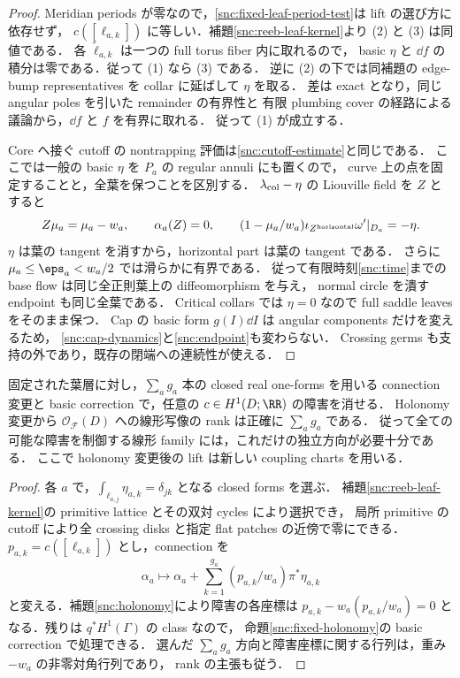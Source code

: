 \begin{proof}
Meridian periods が零なので，\eqref{snc:fixed-leaf-period-test}は lift の選び方に依存せず，
$c([\ell_{a,k}])$ に等しい．補題\ref{snc:reeb-leaf-kernel}より (2) と (3) は同値である．
各 $\widetilde\ell_{a,k}$ は一つの full torus fiber 内に取れるので，
basic $\eta$ と $\dd f$ の積分は零である．従って (1) なら (3) である．
逆に (2) の下では同補題の edge-bump representatives を collar に延ばして $\eta$ を取る．
差は exact となり，同じ angular poles を引いた remainder の有界性と
有限 plumbing cover の経路による議論から，$\dd f$ と $f$ を有界に取れる．
従って (1) が成立する．

Core へ接ぐ cutoff の nontrapping 評価は\eqref{snc:cutoff-estimate}と同じである．
ここでは一般の basic $\eta$ を $P_a$ の regular annuli にも置くので，
curve 上の点を固定することと，全葉を保つことを区別する．
$\lambda_{\rm col}-\eta$ の Liouville field を $Z$ とすると
\[
 Z\mu_a=\mu_a-w_a,\qquad \alpha_a(Z)=0,\qquad
 (1-\mu_a/w_a)\iota_{Z^{\rm horizontal}}\omega'|_{D_a}=-\eta.
\]
$\eta$ は葉の tangent を消すから，horizontal part は葉の tangent である．
さらに $\mu_a\le\eps_a<w_a/2$ では滑らかに有界である．
従って有限時刻\eqref{snc:time}までの base flow は同じ全正則葉上の diffeomorphism を与え，
normal circle を潰す endpoint も同じ全葉である．
Critical collars では $\eta=0$ なので full saddle leaves をそのまま保つ．
Cap の basic form $g(I)\dd I$ は angular components だけを変えるため，
\eqref{snc:cap-dynamics}と\eqref{snc:endpoint}も変わらない．
Crossing germs も支持の外であり，既存の閉端への連続性が使える．
\end{proof}

\begin{corollary}
\label{snc:minimal-holonomy-controls}
固定された葉層に対し，$\sum_a g_a$ 本の closed real one-forms を用いる connection
変更と basic correction で，任意の $c\in H^1(D;\RR)$ の障害を消せる．
Holonomy 変更から $\mathcal O_{\mathcal F}(D)$ への線形写像の rank は正確に $\sum_a g_a$ である．
従って全ての可能な障害を制御する線形 family には，これだけの独立方向が必要十分である．
ここで holonomy 変更後の lift は新しい coupling charts を用いる．
\end{corollary}

\begin{proof}
各 $a$ で，$\int_{\ell_{a,j}}\eta_{a,k}=\delta_{jk}$ となる closed forms を選ぶ．
補題\ref{snc:reeb-leaf-kernel}の primitive lattice とその双対 cycles により選択でき，
局所 primitive の cutoff により全 crossing disks と指定 flat patches の近傍で零にできる．
$p_{a,k}=c([\ell_{a,k}])$ とし，connection を
\[
 \alpha_a\longmapsto\alpha_a+
       \sum_{k=1}^{g_a}(p_{a,k}/w_a)\pi^*\eta_{a,k}
\]
と変える．補題\ref{snc:holonomy}により障害の各座標は
$p_{a,k}-w_a(p_{a,k}/w_a)=0$ となる．残りは $q^*H^1(\Gamma)$ の class なので，
命題\ref{snc:fixed-holonomy}の basic correction で処理できる．
選んだ $\sum_a g_a$ 方向と障害座標に関する行列は，重み $-w_a$ の非零対角行列であり，
rank の主張も従う．
\end{proof}

